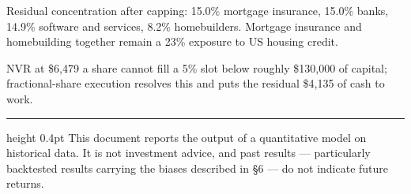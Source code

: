 \documentclass[11pt,a4paper]{article}
\begin{document}
Residual concentration after capping: 15.0\% mortgage insurance, 15.0\% banks,
14.9\% software and services, 8.2\% homebuilders. Mortgage insurance and
homebuilding together remain a 23\% exposure to US housing credit.

NVR at \$6,479 a share cannot fill a 5\% slot below roughly \$130,000 of
capital; fractional-share execution resolves this and puts the residual
\$4,135 of cash to work.

\vspace{1.2em}
\hrule height 0.4pt
\vspace{0.6em}
{\footnotesize\color{ink2}\sffamily This document reports the output of a
quantitative model on historical data. It is not investment advice, and past
results --- particularly backtested results carrying the biases described in
\S6 --- do not indicate future returns.}
\end{document}
